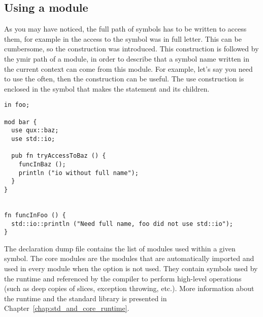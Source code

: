 
\subsection {Using a module}

As you may have noticed, the full path of symbols has to be written to access
them, for example in  the access to the symbol
 was in full letter. This can be cumbersome, so the
construction  was introduced. This construction is followed by the
ymir path of a module, in order to describe that a symbol name written in the
current context can come from this module. For example, let's say you need to
use the  often, then the  construction can
be useful. The use construction is enclosed in the symbol that makes the
statement and its children.

\begin{lstlisting}[caption=\textit{./foo.yr}, style=coloredverbatim]
in foo;

mod bar {
  use qux::baz;
  use std::io;

  pub fn tryAccessToBaz () {
    funcInBaz ();
    println ("io without full name");
  }
}


fn funcInFoo () {
  std::io::println ("Need full name, foo did not use std::io");
}
\end{lstlisting}

The declaration dump file  contains the list of
modules used within a given symbol. The core modules are the modules that are
automatically imported and used in every module when the 
option is not used. They contain symbols used by the runtime and referenced by
the compiler to perform high-level operations (such as deep copies of slices,
exception throwing, etc.). More information about the runtime and the standard
library is presented in Chapter~\ref{chap:std_and_core_runtime}.

